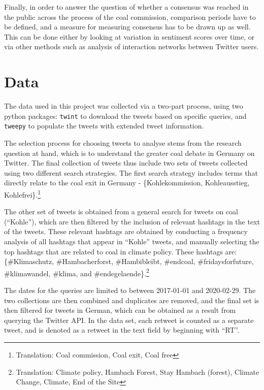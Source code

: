 \documentclass[12pt,onecolumn,twoside]{layout}
\begin{document}
Finally, in order to answer the question of whether a consensus was reached in the public across the process of the coal commission, comparison periods have to be defined, and a measure for measuring consensus has to be drawn up as well. This can be done either by looking at variation in sentiment scores over time, or via other methods such as analysis of interaction networks between Twitter users. 

\section*{Data} \label{sec:data}
The data used in this project was collected via a two-part process, using two python packages: \texttt{twint} to download the tweets based on specific queries, and \texttt{tweepy} to populate the tweets with extended tweet information. %

The selection process for choosing tweets to analyse stems from the research question at hand, which is to understand the greater coal debate in Germany on Twitter. The final collection of tweets thus include two sets of tweets collected using two different search strategies. The first search strategy includes terms that directly relate to the coal exit in Germany - \{Kohlekommission, Kohleausstieg, Kohlefrei\}.\footnote{Translation: Coal commission, Coal exit, Coal free}

The other set of tweets is obtained from a general search for tweets on coal (``Kohle''), which are then filtered by the inclusion of relevant hashtags in the text of the tweets. These relevant hashtags are obtained by conducting a frequency analysis of all hashtags that appear in ``Kohle'' tweets, and manually selecting the top hashtags that are related to coal in climate policy. These hashtags are:  \{\#Klimaschutz, \#Hambacherforst, \#Hambibleibt, \#endcoal, \#fridaysforfuture, \#klimawandel, \#klima, and \#endegelaende\}.\footnote{Translation: Climate policy, Hambach Forest, Stay Hambach (forest), Climate Change, Climate, End of the Site} 

The dates for the queries are limited to between 2017-01-01 and 2020-02-29. The two collections are then combined and duplicates are removed, and the final set is then filtered for tweets in German, which can be obtained as a result from querying the Twitter API. In the data set, each retweet is counted as a separate tweet, and is denoted as a retweet in the text field by beginning with ``RT''. 
\end{document}
